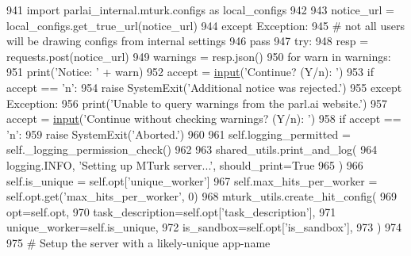 \begin{DoxyCode}
{{{941                 \textcolor{keyword}{import} parlai\_internal.mturk.configs \textcolor{keyword}{as} local\_configs
942 
943                 notice\_url = local\_configs.get\_true\_url(notice\_url)
944             \textcolor{keywordflow}{except} Exception:
945                 \textcolor{comment}{# not all users will be drawing configs from internal settings}
946                 \textcolor{keywordflow}{pass}
947             \textcolor{keywordflow}{try}:
948                 resp = requests.post(notice\_url)
949                 warnings = resp.json()
950                 \textcolor{keywordflow}{for} warn \textcolor{keywordflow}{in} warnings:
951                     print(\textcolor{stringliteral}{'Notice: '} + warn)
952                     accept = \hyperlink{namespaceparlai_1_1mturk_1_1core_1_1dev_1_1test_1_1test__full__system_a1e1817cd65688fb90f827834d1fb4567}{input}(\textcolor{stringliteral}{'Continue? (Y/n): '})
953                     \textcolor{keywordflow}{if} accept == \textcolor{stringliteral}{'n'}:
954                         \textcolor{keywordflow}{raise} SystemExit(\textcolor{stringliteral}{'Additional notice was rejected.'})
955             \textcolor{keywordflow}{except} Exception:
956                 print(\textcolor{stringliteral}{'Unable to query warnings from the parl.ai website.'})
957                 accept = \hyperlink{namespaceparlai_1_1mturk_1_1core_1_1dev_1_1test_1_1test__full__system_a1e1817cd65688fb90f827834d1fb4567}{input}(\textcolor{stringliteral}{'Continue without checking warnings? (Y/n): '})
958                 \textcolor{keywordflow}{if} accept == \textcolor{stringliteral}{'n'}:
959                     \textcolor{keywordflow}{raise} SystemExit(\textcolor{stringliteral}{'Aborted.'})
960 
961         self.logging\_permitted = self.\_logging\_permission\_check()
962 
963         shared\_utils.print\_and\_log(
964             logging.INFO, \textcolor{stringliteral}{'Setting up MTurk server...'}, should\_print=\textcolor{keyword}{True}
965         )
966         self.is\_unique = self.opt[\textcolor{stringliteral}{'unique\_worker'}]
967         self.max\_hits\_per\_worker = self.opt.get(\textcolor{stringliteral}{'max\_hits\_per\_worker'}, 0)
968         mturk\_utils.create\_hit\_config(
969             opt=self.opt,
970             task\_description=self.opt[\textcolor{stringliteral}{'task\_description'}],
971             unique\_worker=self.is\_unique,
972             is\_sandbox=self.opt[\textcolor{stringliteral}{'is\_sandbox'}],
973         )
974 
975         \textcolor{comment}{# Setup the server with a likely-unique app-name}
}}}
\end{DoxyCode}
